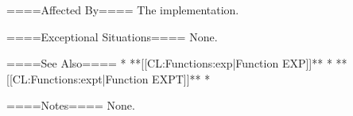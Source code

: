 ====Affected By====
The implementation.

====Exceptional Situations====
None.

====See Also====
  * **[[CL:Functions:exp|Function EXP]]**
  * **[[CL:Functions:expt|Function EXPT]]**
  * {\secref\FloatSubstitutability}

====Notes====
None.

   
